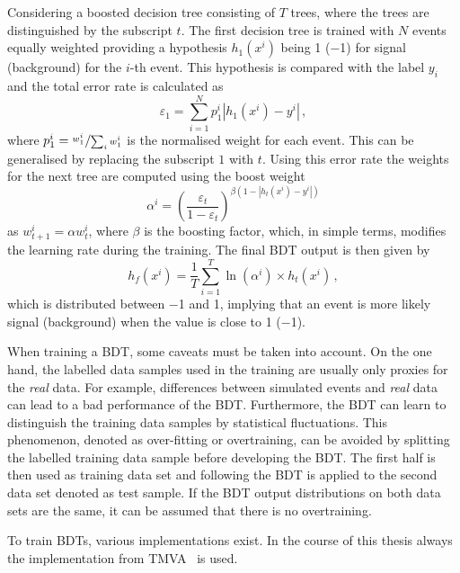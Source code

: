 Considering a boosted decision tree consisting of $T$ trees, where the trees are distinguished by the subscript $t$.
The first decision tree is trained with $N$ events equally weighted providing a hypothesis $h_1(x^i)$ being \num{+1} (\num{-1}) for signal (background) for the $i$-th event.
This hypothesis is compared with the label $y_i$ and the total error rate is calculated as
\begin{equation}
\varepsilon_1=\sum_{i=1}^{N}p^i_1\left|h_1(x^i)-y^i\right|\,,
\end{equation}
where $p_1^i=\nicefrac{w_1^i\,}{\sum_{i}w_1^i}$ is the normalised weight for each event.
This can be generalised by replacing the subscript $1$ with $t$.
Using this error rate the weights for the next tree are computed using the boost weight
\begin{equation}
\alpha^i=\left(\frac{\varepsilon_t}{1-\varepsilon_t}\right)^{\beta\left(1-\left|h_t(x^i)-y^i\right|\right)}
\end{equation}
as $w_{t+1}^i=\alpha w_t^i$, where $\beta$ is the boosting factor,  which, in simple terms, modifies the learning rate during the training.
The final BDT output is then given by
\begin{equation}
h_f(x^i)=\frac{1}{T}\sum_{i=1}^{T}\ln\left(\alpha^i\right)\times h_t(x^i)\,,
\end{equation}
which is distributed between \num{-1} and \num{+1}, implying that an event is more likely signal (background) when the value is close to \num{+1} (\num{-1}).

When training a \ac{BDT}, some caveats must be taken into account.
On the one hand, the labelled data samples used in the training are usually only proxies for the \emph{real} data.
For example, differences between simulated events and \emph{real} data can lead to a bad performance of the \ac{BDT}.
Furthermore, the \ac{BDT} can learn to distinguish the training data samples by statistical fluctuations.
This phenomenon, denoted as over-fitting or overtraining, can be avoided by splitting the labelled training data sample before developing the \ac{BDT}.
The first half is then used as training data set and following the \ac{BDT} is applied to the second data set denoted as test sample.
If the \ac{BDT} output distributions on both data sets are the same, it can be assumed that there is no overtraining.

To train \ac{BDT}s, various implementations exist.
In the course of this thesis always the implementation from TMVA~\cite{Hocker:2007ht} is used.


